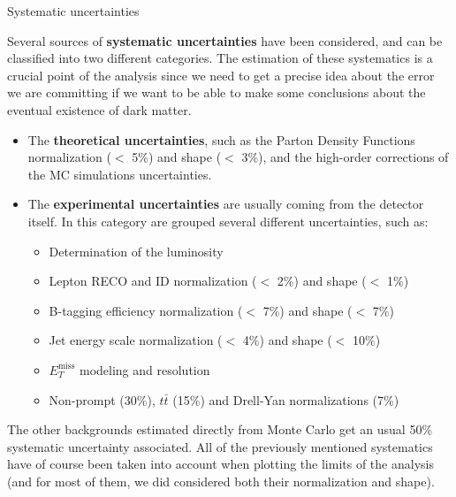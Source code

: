 \documentclass[handout,8 pt]{beamer}
\begin{document}
\begin{frame}{Systematic uncertainties}

	\justifying
	Several sources of \textbf{systematic uncertainties} have been considered, and can be classified into two different categories. The estimation of these systematics is a crucial point of the analysis since we need to get a precise idea about the error we are committing if we want to be able to make some conclusions about the eventual existence of dark matter. \vfill
	
	\begin{itemize}
	\justifying
	\item The \textbf{\color{mycolor}theoretical uncertainties\color{black}}, such as the Parton Density Functions normalization ($<$ 5\%) and shape ($<$ 3\%), and the high-order corrections of the MC simulations uncertainties. \vfill
	\item The \textbf{\color{mycolor}experimental uncertainties\color{black}} are usually coming from the detector itself. In this category are grouped several different uncertainties, such as:
	\vspace{-5pt}
		\begin{multicols}{2}
		\begin{itemize}
		\item Determination of the luminosity
		\item Lepton RECO and ID normalization ($<$ 2\%) and shape ($<$ 1\%)
		\item B-tagging efficiency normalization ($<$ 7\%) and shape ($<$ 7\%)
		\item Jet energy scale normalization ($<$ 4\%) and shape ($<$ 10\%)
		\item $E_T^{\text{miss}}$ modeling and resolution 
		\item Non-prompt (30\%), $t \bar t$ (15\%) and Drell-Yan normalizations (7\%)
		\end{itemize}
		\end{multicols}
	\end{itemize} \vfill
	
	\justifying
	The other backgrounds estimated directly from Monte Carlo get an usual 50\% systematic uncertainty associated. All of the previously mentioned systematics have of course been taken into account when plotting the limits of the analysis (and for most of them, we did considered both their normalization and shape). \vfill

\end{frame}
\end{document}
